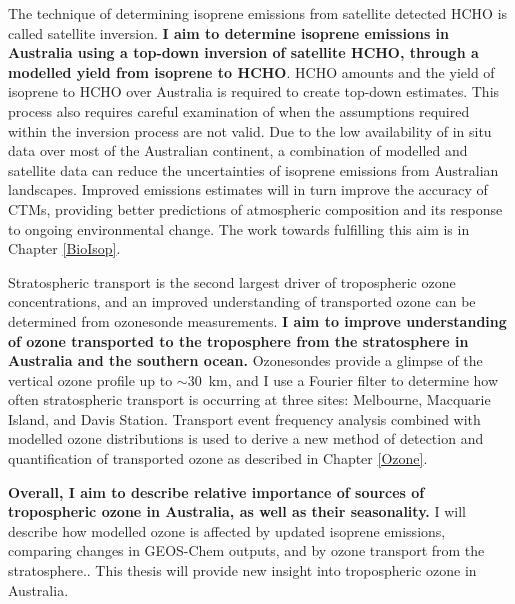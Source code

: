   The technique of determining isoprene emissions from satellite detected HCHO is called satellite inversion.
  \textbf{I aim to determine isoprene emissions in Australia using a top-down inversion of satellite HCHO, through a modelled yield from isoprene to HCHO}.
  HCHO amounts and the yield of isoprene to HCHO over Australia is required to create top-down estimates.
  This process also requires careful examination of when the assumptions required within the inversion process are not valid.
  Due to the low availability of in situ data over most of the Australian continent, a combination of modelled and satellite data can reduce the uncertainties of isoprene emissions from Australian landscapes.
  Improved emissions estimates will in turn improve the accuracy of CTMs, providing better predictions of atmospheric composition and its response to ongoing environmental change.
  The work towards fulfilling this aim is in Chapter \ref{BioIsop}.
  
  Stratospheric transport is the second largest driver of tropospheric ozone concentrations, and an improved understanding of transported ozone can be determined from ozonesonde measurements.
  \textbf{I aim to improve understanding of ozone transported to the troposphere from the stratosphere in Australia and the southern ocean.}
  Ozonesondes provide a glimpse of the vertical ozone profile up to $\sim 30$~km, and I use a Fourier filter to determine how often stratospheric transport is occurring at three sites: Melbourne, Macquarie Island, and Davis Station. 
  Transport event frequency analysis combined with modelled ozone distributions is used to derive a new method of detection and quantification of transported ozone as described in Chapter \ref{Ozone}.
  
  
  \textbf{Overall, I aim to describe relative importance of sources of tropospheric ozone in Australia, as well as their seasonality.}
  I will describe how modelled ozone is affected by updated isoprene emissions, comparing changes in GEOS-Chem outputs, and by ozone transport from the stratosphere..
  This thesis will provide new insight into tropospheric ozone in Australia.
  
